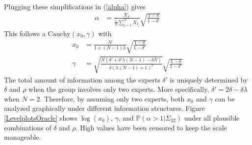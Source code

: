 \documentclass[11pt]{article}
\renewcommand{\P}{\mathbb{P}}
\theoremstyle{definition}
\theoremstyle{definition}
\begin{document}
Plugging these simplifications in (\ref{alpha}) gives 
\begin{align}
\alpha &= \frac{X_{I'}}{\frac{1}{N}\sum_{j=1}^N X_{I_j}} \sqrt{\frac{1-\delta}{1-\delta'}} \label{CompoundAlpha}
\end{align}
This follows a $\text{Cauchy}(x_0, \gamma)$ with
\begin{align*}
x_0 &= \frac{N}{1+(N-1)\lambda}  \sqrt{\frac{1-\delta}{1-\delta'}}\\
 \gamma &=  \sqrt{\frac{N(\delta' + \delta' \lambda (N-1) - \delta N)}{\delta (\lambda (N-1) + 1)^2}}\sqrt{\frac{1-\delta}{1-\delta'}}
\end{align*}
The total amount of information among the experts $\delta'$ is uniquely determined by $\delta$ and $\rho$ when the group involves only two experts. More specifically, $\delta' = 2\delta - \delta\lambda$ when $N=2$. Therefore, by assuming only two experts, both $x_0$ and $\gamma$ can be analyzed graphically under different information structures. Figure \ref{LevelplotsOracle} shows $\log(x_0)$, $\gamma$, and $\P(\alpha > 1 | \Sigma_{22})$ under all plausible combinations of $\delta$ and $\rho$. High values have been censored to keep the scale manageable. 
\end{document}

